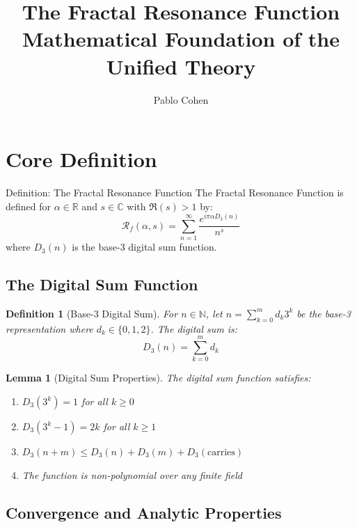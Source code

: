 \documentclass[12pt,letterpaper]{article}
\title{\textbf{The Fractal Resonance Function}\\[0.5cm]
\Large Mathematical Foundation of the Unified Theory}
\author{Pablo Cohen}
\date{}
\newcommand{\R}{\mathbb{R}}
\newcommand{\C}{\mathbb{C}}
\newcommand{\N}{\mathbb{N}}
\newcommand{\fractalres}{\mathcal{R}_f}
\newcommand{\digitalsum}{D_3}
\newtheorem{lemma}[theorem]{Lemma}
\newtheorem{definition}[theorem]{Definition}
\begin{document}
\maketitle

\section{Core Definition}

\begin{mathbox}{Definition: The Fractal Resonance Function}
The Fractal Resonance Function is defined for $\alpha \in \R$ and $s \in \C$ with $\Re(s) > 1$ by:
\begin{equation}
\fractalres(\alpha, s) = \sum_{n=1}^{\infty} \frac{e^{i\pi\alpha\digitalsum(n)}}{n^s}
\end{equation}
where $\digitalsum(n)$ is the base-3 digital sum function.
\end{mathbox}

\subsection{The Digital Sum Function}

\begin{definition}[Base-3 Digital Sum]
For $n \in \N$, let $n = \sum_{k=0}^{m} d_k 3^k$ be the base-3 representation where $d_k \in \{0, 1, 2\}$. The digital sum is:
\begin{equation}
\digitalsum(n) = \sum_{k=0}^{m} d_k
\end{equation}
\end{definition}

\begin{lemma}[Digital Sum Properties]
The digital sum function satisfies:
\begin{enumerate}
\item $\digitalsum(3^k) = 1$ for all $k \geq 0$
\item $\digitalsum(3^k - 1) = 2k$ for all $k \geq 1$
\item $\digitalsum(n + m) \leq \digitalsum(n) + \digitalsum(m) + \digitalsum(\text{carries})$
\item The function is non-polynomial over any finite field
\end{enumerate}
\end{lemma}

\subsection{Convergence and Analytic Properties}
\end{document}
